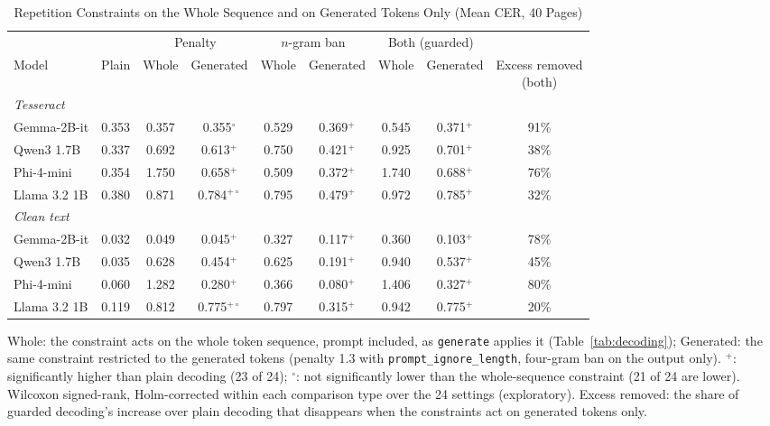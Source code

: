 \begin{table}[t]
\centering
\caption{Repetition Constraints on the Whole Sequence and on Generated Tokens Only (Mean CER, 40 Pages)}
\label{tab:decodinggen}
\setlength{\tabcolsep}{4pt}
\footnotesize
\begin{tabular}{lcccccccc}
\toprule
 & & \multicolumn{2}{c}{Penalty} & \multicolumn{2}{c}{$n$-gram ban} & \multicolumn{2}{c}{Both (guarded)} & \\
\cmidrule(lr){3-4}\cmidrule(lr){5-6}\cmidrule(lr){7-8}
Model & Plain & Whole & Generated & Whole & Generated & Whole & Generated & \shortstack{Excess removed\\(both)} \\
\midrule
\multicolumn{9}{l}{\textit{Tesseract}} \\
Gemma-2B-it & 0.353 & 0.357 & 0.355$^{\circ}$ & 0.529 & 0.369$^{+}$ & 0.545 & 0.371$^{+}$ & 91\% \\
Qwen3 1.7B & 0.337 & 0.692 & 0.613$^{+}$ & 0.750 & 0.421$^{+}$ & 0.925 & 0.701$^{+}$ & 38\% \\
Phi-4-mini & 0.354 & 1.750 & 0.658$^{+}$ & 0.509 & 0.372$^{+}$ & 1.740 & 0.688$^{+}$ & 76\% \\
Llama 3.2 1B & 0.380 & 0.871 & 0.784$^{+\circ}$ & 0.795 & 0.479$^{+}$ & 0.972 & 0.785$^{+}$ & 32\% \\
\midrule
\multicolumn{9}{l}{\textit{Clean text}} \\
Gemma-2B-it & 0.032 & 0.049 & 0.045$^{+}$ & 0.327 & 0.117$^{+}$ & 0.360 & 0.103$^{+}$ & 78\% \\
Qwen3 1.7B & 0.035 & 0.628 & 0.454$^{+}$ & 0.625 & 0.191$^{+}$ & 0.940 & 0.537$^{+}$ & 45\% \\
Phi-4-mini & 0.060 & 1.282 & 0.280$^{+}$ & 0.366 & 0.080$^{+}$ & 1.406 & 0.327$^{+}$ & 80\% \\
Llama 3.2 1B & 0.119 & 0.812 & 0.775$^{+\circ}$ & 0.797 & 0.315$^{+}$ & 0.942 & 0.775$^{+}$ & 20\% \\
\bottomrule
\end{tabular}
\par\smallskip
\begin{minipage}{\linewidth}\footnotesize Whole: the constraint acts on the whole token sequence, prompt included, as \texttt{generate} applies it (Table~\ref{tab:decoding}); Generated: the same constraint restricted to the generated tokens (penalty 1.3 with \texttt{prompt\_ignore\_length}, four-gram ban on the output only). $^{+}$: significantly higher than plain decoding (23 of 24); $^{\circ}$: not significantly lower than the whole-sequence constraint (21 of 24 are lower). Wilcoxon signed-rank, Holm-corrected within each comparison type over the 24 settings (exploratory). Excess removed: the share of guarded decoding's increase over plain decoding that disappears when the constraints act on generated tokens only.\end{minipage}
\end{table}
